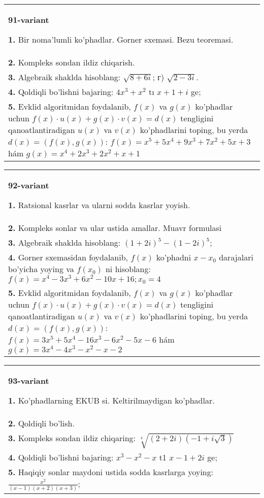\documentclass{article}
\begin{document}
\begin{tabular}{m{17cm}}
\textbf{91-variant}
\newline

\textbf{1.} Bir noma’lumli ko’phadlar. Gorner sxemasi. Bezu teoremasi.  \\
\textbf{2.} Kompleks sondan ildiz chiqarish. \\
\textbf{3.} Algebraik shaklda hisoblang: $\sqrt{8+6 i}$; г) $\sqrt{2-3 i}$. \\
\textbf{4.} Qoldiqli bo’lishni bajaring: $4 x^3+x^2$ tı $x+1+i$ ge; \\
\textbf{5.} Evklid algoritmidan foydalanib, $f(x)$ va $g(x)$ ko’phadlar uchun $f(x) \cdot u(x)+g(x) \cdot v(x)=d(x)$ tengligini qanoatlantiradigan $u(x)$ va $v(x)$ ko’phadlarini toping, bu yerda $d(x)=(f(x), g(x))$:  $f(x)=x^5+5 x^4+9 x^3+7 x^2+5 x+3$ hám $g(x)=x^4+2 x^3+2 x^2+x+1$ \\

\end{tabular}
\vspace{1cm}


\begin{tabular}{m{17cm}}
\textbf{92-variant}
\newline

\textbf{1.} Ratsional kasrlar va ularni sodda kasrlar yoyish. \\
\textbf{2.} Kompleks sonlar va ular ustida amallar. Muavr formulasi  \\
\textbf{3.} Algebraik shaklda hisoblang: $(1+2 i)^5-(1-2 i)^5$; \\
\textbf{4.} Gorner sxemasidan foydalanib, $f(x)$ ko’phadni $x-x_0$ darajalari bo’yicha yoying va $f\left(x_0\right)$ ni hisoblang: $f(x)=x^4-3 x^3+6 x^2-10 x+16 ; x_0=4$ \\
\textbf{5.} Evklid algoritmidan foydalanib, $f(x)$ va $g(x)$ ko’phadlar uchun $f(x) \cdot u(x)+g(x) \cdot v(x)=d(x)$ tengligini qanoatlantiradigan $u(x)$ va $v(x)$ ko’phadlarini toping, bu yerda $d(x)=(f(x), g(x))$:  $f(x)=3 x^5+5 x^4-16 x^3-6 x^2-5 x-6$ hám $g(x)=3 x^4-4 x^3-x^2-x-2$ \\

\end{tabular}
\vspace{1cm}


\begin{tabular}{m{17cm}}
\textbf{93-variant}
\newline

\textbf{1.} Ko’phadlarning EKUB si. Keltirilmaydigan ko’phadlar. \\
\textbf{2.} Qoldiqli bo’lish.  \\
\textbf{3.} Kompleks sondan ildiz chiqaring: $\sqrt[4]{(2+2 i)(-1+i \sqrt{3})}$ \\
\textbf{4.} Qoldiqli bo’lishni bajaring:  $x^3-x^2-x$ t1 $x-1+2 i$ ge; \\
\textbf{5.} Haqiqiy sonlar maydoni ustida sodda kasrlarga yoying:  $\frac{x^2}{(x-1)(x+2)(x+3)}$; \\

\end{tabular}
\vspace{1cm}
\end{document}
